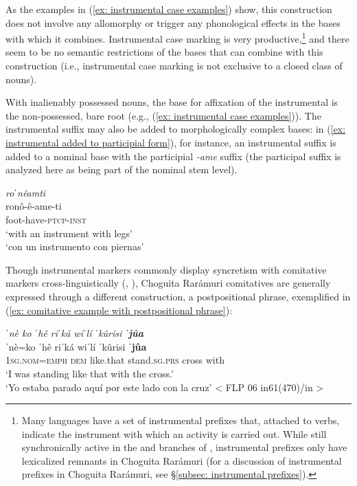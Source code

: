 As the examples in (\ref{ex: instrumental case examples}) show, this construction does not involve any allomorphy or trigger any phonological effects in the bases with which it combines. Instrumental case marking is very productive,\footnote{Many  languages have a set of instrumental prefixes that, attached to verbs, indicate the instrument with which an activity is carried out. While still synchronically active in the  and  branches of  \parencite{dayley1989tumpisa}, instrumental prefixes only have lexicalized remnants in Choguita Rarámuri (for a discussion of instrumental prefixes in Choguita Rarámuri, see §\ref{subsec: instrumental prefixes}).} and there seem to be no semantic restrictions of the bases that can combine with this construction (i.e., instrumental case marking is not exclusive to a closed class of nouns).

With inalienably possessed nouns, the base for affixation of the instrumental is the non-possessed, bare root (e.g., (\ref{ex: instrumental case examples})). The instrumental suffix may also be added to morphologically complex bases: in (\ref{ex: instrumental added to participial form}), for instance, an instrumental suffix is added to a nominal base with the participial \textit{-ame} suffix (the participal suffix is analyzed here as being part of the nominal stem level).

\ea\label{ex: instrumental added to participial form}

\textit{{roˈnêamti}}\\
\gll    ronô-ê-ame-ti\\
        foot-have-\textsc{ptcp-inst}\\
\glt    ‘with an instrument with legs’\\
\glt    ‘con un instrumento con piernas’   \\

\z

Though instrumental markers commonly display syncretism with comitative markers cross-linguistically (\citealt{Stassen-2000}, \citealt{Stolz-2001a}), Choguita Rarámuri comitatives are generally expressed through a different construction, a postpositional phrase, exemplified in (\ref{ex: comitative example with postpositional phrase}):

 \ea\label{ex: comitative example with postpositional phrase}

{\textit{ˈnè      ko     ˈhê   riˈká    wiˈlí        ˈkûrisi   \textbf{ˈjûa}}}\\
\gll    ˈnè=ko    ˈhê  riˈká  wiˈlí      ˈkûrisi    \textbf{ˈjûa}\\
        \textsc{1sg.nom}=\textsc{emph} \textsc{dem} like.that stand.\textsc{sg.prs} cross     {with} \\
\glt    ‘I was standing like that with the cross.’\\
\glt    ‘Yo estaba parado aquí por este lado con la cruz’ < FLP 06 in61(470)/in >\\

